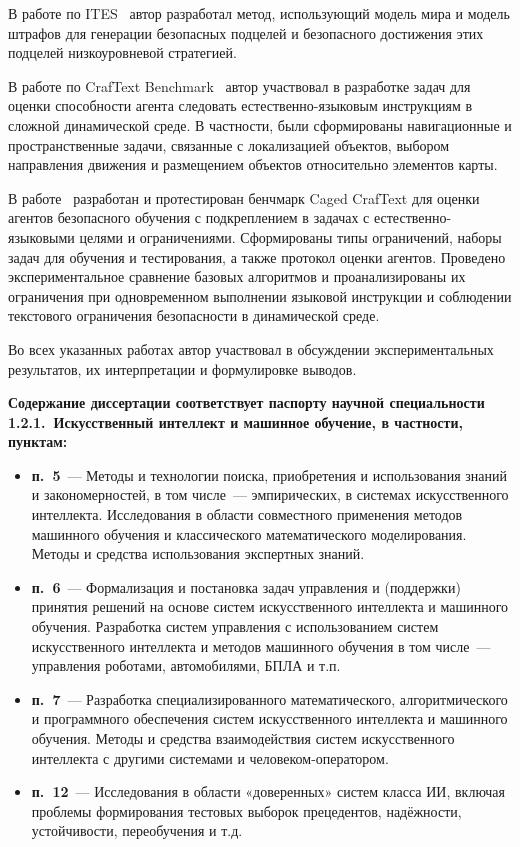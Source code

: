В работе по ITES~ автор разработал метод, использующий модель мира и модель штрафов для генерации безопасных подцелей и безопасного достижения этих подцелей низкоуровневой стратегией.

В работе по CrafText Benchmark~ автор участвовал в разработке задач для оценки способности агента следовать естественно-языковым инструкциям в сложной динамической среде. В частности, были сформированы навигационные и пространственные задачи, связанные с локализацией объектов, выбором направления движения и размещением объектов относительно элементов карты.

В работе~ разработан и протестирован бенчмарк Caged CrafText для оценки агентов безопасного обучения с подкреплением в задачах с естественно-языковыми целями и ограничениями. Сформированы типы ограничений, наборы задач для обучения и тестирования, а также протокол оценки агентов. Проведено экспериментальное сравнение базовых алгоритмов и проанализированы их ограничения при одновременном выполнении языковой инструкции и соблюдении текстового ограничения безопасности в динамической среде.

Во всех указанных работах автор участвовал в обсуждении экспериментальных результатов, их интерпретации и формулировке выводов.

\textbf{Содержание диссертации соответствует паспорту научной специальности 1.2.1.~Искусственный интеллект и машинное обучение, в частности, пунктам:}
\begin{itemize}
  \item \textbf{п.~5}~--- Методы и технологии поиска, приобретения и использования знаний и закономерностей, в том числе~--- эмпирических, в системах искусственного интеллекта. Исследования в области совместного применения методов машинного обучения и классического математического моделирования. Методы и средства использования экспертных знаний.
  \item \textbf{п.~6}~--- Формализация и постановка задач управления и (поддержки) принятия решений на основе систем искусственного интеллекта и машинного обучения. Разработка систем управления с использованием систем искусственного интеллекта и методов машинного обучения в том числе~--- управления роботами, автомобилями, БПЛА и т.п.
  \item \textbf{п.~7}~--- Разработка специализированного математического, алгоритмического и программного обеспечения систем искусственного интеллекта и машинного обучения. Методы и средства взаимодействия систем искусственного интеллекта с другими системами и человеком-оператором.
  \item \textbf{п.~12}~--- Исследования в области «доверенных» систем класса ИИ, включая проблемы формирования тестовых выборок прецедентов, надёжности, устойчивости, переобучения и т.д.
\end{itemize}
